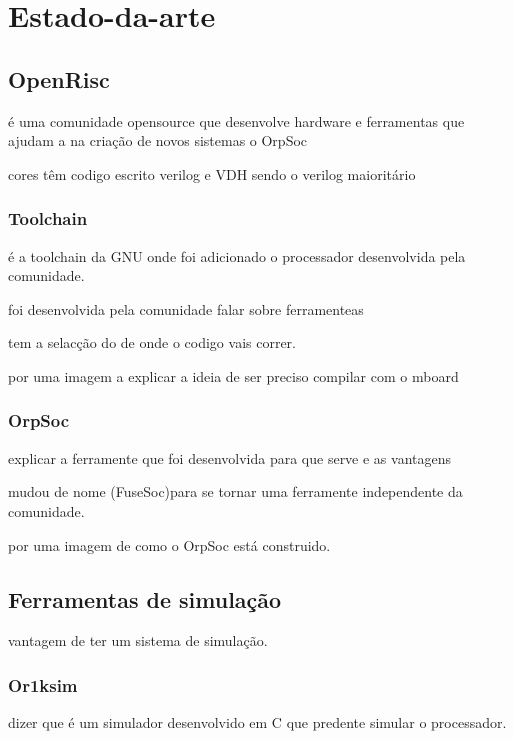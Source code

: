 \chapter{Estado-da-arte}
\label{chapter:estadodaarte}

\section{OpenRisc}
\label{section:OpenRisc}

é uma comunidade opensource que desenvolve hardware e ferramentas que ajudam a na cria\c{c}\~ao de novos sistemas o OrpSoc

cores têm codigo escrito verilog e VDH sendo o verilog maioritário

\subsection{Toolchain}

é a toolchain da GNU onde foi adicionado o processador desenvolvida pela comunidade.

foi desenvolvida pela comunidade falar sobre ferramenteas 

tem a selac\c{c}\~ao do de onde o codigo vais correr.

por uma imagem a explicar a ideia de ser preciso compilar com o mboard

\subsection{OrpSoc}

explicar a ferramente que foi desenvolvida para que serve e as vantagens 

mudou de nome (FuseSoc)para se tornar uma ferramente independente da comunidade.

por uma imagem de como o OrpSoc está construido.

\section{Ferramentas de simula\c{c}\~ao}
\label{section:ferramentas}

vantagem de ter um sistema de simula\c{c}\~ao.

\subsection{Or1ksim}

dizer que é um simulador desenvolvido em C que predente simular o processador.

